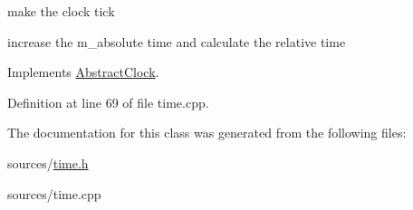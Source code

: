 make the clock tick 

increase the m\_\-absolute time and calculate the relative time 

Implements \hyperlink{classAbstractClock_ad161ad323e50eeba01cc97720a2c469e}{AbstractClock}.



Definition at line 69 of file time.cpp.



The documentation for this class was generated from the following files:\begin{DoxyCompactItemize}
\item 
sources/\hyperlink{time_8h}{time.h}\item 
sources/time.cpp\end{DoxyCompactItemize}
